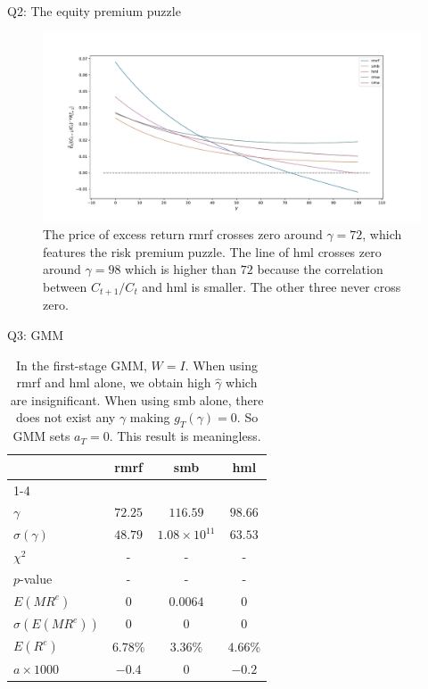\documentclass[10pt,t]{beamer}
\begin{document}
\begin{frame}{Q2: The equity premium puzzle}
\begin{figure}[h!]
\centering
\includegraphics[width=\linewidth]{q2fig1.pdf}
\caption{The price of excess return rmrf crosses zero around $\gamma = 72$, which features the risk premium puzzle. The line of hml crosses zero around $\gamma = 98$ which is higher than $72$ because the correlation between $C_{t+1} / C_t$ and hml is smaller. The other three never cross zero.}
\end{figure}
\end{frame}


\begin{frame}{Q3: GMM}
\begin{table}
\begin{tabular}{lccc}
\toprule
& rmrf & smb & hml \\
\cmidrule{1-4}
\multicolumn{4}{l}{first-stage GMM} \\
$\gamma$ & $72.25$ & $116.59$ & $98.66$\\
$\sigma(\gamma)$ & $48.79$ & $1.08 \times 10^{11}$ & $63.53$\\
$\chi^2$ & - & - & - \\
$p$-value & - & - & - \\
$E(MR^e)$ & $0$ & $0.0064$ & $0$ \\
$\sigma(E(MR^e))$ & $0$ & $0$ & $0$ \\
$E(R^e)$ & $6.78\%$ & $3.36\%$ & $4.66\%$\\
$a\times 1000$ & $-0.4$ & $0$ & $-0.2$ \\
\bottomrule
\end{tabular}
\caption{In the first-stage GMM, $W = I$. When using rmrf and hml alone, we obtain high $\hat{\gamma}$ which are insignificant. When using smb alone, there does not exist any $\gamma$ making $g_T(\gamma) = 0$. So GMM sets $a_T = 0$. This result is meaningless.}
\end{table}
\end{frame}
\end{document}
